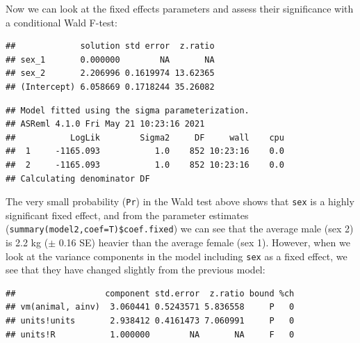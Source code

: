 \documentclass[
  12pt,
]{book}
\newenvironment{Shaded}{\begin{snugshade}}{\end{snugshade}}
\newcommand{\AttributeTok}[1]{\textcolor[rgb]{0.77,0.63,0.00}{#1}}
\newcommand{\ConstantTok}[1]{\textcolor[rgb]{0.00,0.00,0.00}{#1}}
\newcommand{\FunctionTok}[1]{\textcolor[rgb]{0.00,0.00,0.00}{#1}}
\newcommand{\NormalTok}[1]{#1}
\newcommand{\SpecialCharTok}[1]{\textcolor[rgb]{0.00,0.00,0.00}{#1}}
\newcommand{\StringTok}[1]{\textcolor[rgb]{0.31,0.60,0.02}{#1}}
\begin{document}
Now we can look at the fixed effects parameters and assess their significance with a conditional Wald F-test:

\begin{Shaded}
\end{Shaded}

\begin{verbatim}
##             solution std error  z.ratio
## sex_1       0.000000        NA       NA
## sex_2       2.206996 0.1619974 13.62365
## (Intercept) 6.058669 0.1718244 35.26082
\end{verbatim}

\begin{verbatim}
## Model fitted using the sigma parameterization.
## ASReml 4.1.0 Fri May 21 10:23:16 2021
##           LogLik        Sigma2     DF     wall    cpu
##  1     -1165.093           1.0    852 10:23:16    0.0
##  2     -1165.093           1.0    852 10:23:16    0.0
## Calculating denominator DF
\end{verbatim}

The very small probability (\texttt{Pr}) in the Wald test above shows that \texttt{sex} is a highly significant fixed effect, and from the parameter estimates (\texttt{summary(model2,coef=T)\$coef.fixed}) we can see that the average male (sex 2) is 2.2 kg (\(\pm\) 0.16 SE) heavier than the average female (sex 1). However, when we look at the variance components in the model including \texttt{sex} as a fixed effect, we see that they have changed slightly from the previous model:

\begin{Shaded}
\end{Shaded}

\begin{verbatim}
##                  component std.error  z.ratio bound %ch
## vm(animal, ainv)  3.060441 0.5243571 5.836558     P   0
## units!units       2.938412 0.4161473 7.060991     P   0
## units!R           1.000000        NA       NA     F   0
\end{verbatim}
\end{document}
